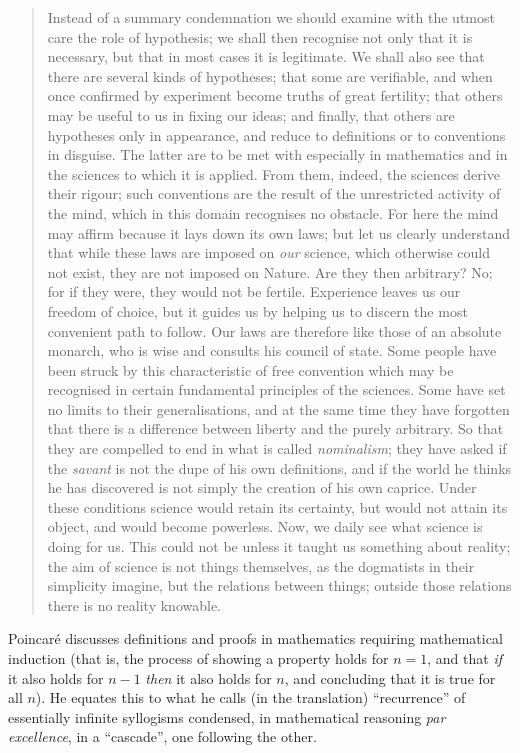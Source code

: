 \begin{quote}
    Instead of a summary condemnation we should examine with the utmost care the role of hypothesis; we shall then recognise not only that it is necessary, but that in most cases it is legitimate.  We shall also see that there are several kinds of hypotheses; that some are verifiable, and when once confirmed by experiment become truths of great fertility; that others may be useful to us in fixing our ideas; and finally, that others are hypotheses only in appearance, and reduce to definitions or to conventions in disguise.  The latter are to be met with especially in mathematics and in the sciences to which it is applied.  From them, indeed, the sciences derive their rigour; such conventions are the result of the unrestricted activity of the mind, which in this domain recognises no obstacle.  For here the mind may affirm because it lays down its own laws; but let us clearly understand that while these laws are imposed on \emph{our} science, which otherwise could not exist, they are not imposed on Nature.  Are they then arbitrary?  No; for if they were, they would not be fertile.  Experience leaves us our freedom of choice, but it guides us by helping us to discern the most convenient path to follow.  Our laws are therefore like those of an absolute monarch, who is wise and consults his council of state.  Some people have been struck by this characteristic of free convention which may be recognised in certain fundamental principles of the sciences.  Some have set no limits to their generalisations, and at the same time they have forgotten that there is a difference between liberty and the purely arbitrary.  So that they are compelled to end in what is called \emph{nominalism}; they have asked if the \emph{savant} is not the dupe of his own definitions, and if the world he thinks he has discovered is not simply the creation of his own caprice.  Under these conditions science would retain its certainty, but would not attain its object, and would become powerless.  Now, we daily see what science is doing for us.  This could not be unless it taught us something about reality; the aim of science is not things themselves, as the dogmatists in their simplicity imagine, but the relations between things; outside those relations there is no reality knowable.  \citep[p. xxii-xxiv]{Poincare1952}
\end{quote}

Poincar\'e discusses definitions and proofs in mathematics requiring mathematical induction (that is, the process of showing a property holds for $n = 1$, and that \emph{if} it also holds for $n - 1$ \emph{then} it also holds for $n$, and concluding that it is true for all $n$).  He equates this to what he calls (in the translation) ``recurrence'' of essentially infinite syllogisms condensed, in mathematical reasoning \emph{par excellence}, in a ``cascade'', one following the other.  \citep[p. 9]{Poincare1952}  

